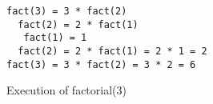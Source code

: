 




\begin {figure}

\begin {verbatim}
fact(3) = 3 * fact(2)
  fact(2) = 2 * fact(1)
   fact(1) = 1
  fact(2) = 2 * fact(1) = 2 * 1 = 2
fact(3) = 3 * fact(2) = 3 * 2 = 6
\end{verbatim}


\caption {Execution of factorial(3)}

\label {fig:factorial}

\end {figure}


